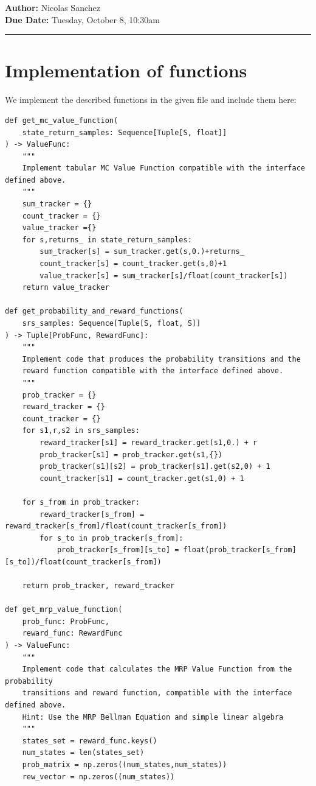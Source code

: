 \documentclass{article}[12pt]
\newcommand{\headings}[4]{\noindent {\bf Assignment 15 CME241} \hfill {{\bf Author:} Nicolas Sanchez} \\
{} \hfill {{\bf Due Date:} #2} \\

\rule[0.1in]{\textwidth}{0.025in}
}
\begin{document}
\headings{\#1}{Tuesday, October 8, 10:30am}\section{} 



\section{Implementation of functions}
We implement the described functions in the given file and include them here:
\begin{lstlisting}
def get_mc_value_function(
    state_return_samples: Sequence[Tuple[S, float]]
) -> ValueFunc:
    """
    Implement tabular MC Value Function compatible with the interface defined above.
    """
    sum_tracker = {}
    count_tracker = {}
    value_tracker ={}
    for s,returns_ in state_return_samples:
        sum_tracker[s] = sum_tracker.get(s,0.)+returns_
        count_tracker[s] = count_tracker.get(s,0)+1
        value_tracker[s] = sum_tracker[s]/float(count_tracker[s])
    return value_tracker
  
def get_probability_and_reward_functions(
    srs_samples: Sequence[Tuple[S, float, S]]
) -> Tuple[ProbFunc, RewardFunc]:
    """
    Implement code that produces the probability transitions and the
    reward function compatible with the interface defined above.
    """
    prob_tracker = {}
    reward_tracker = {}
    count_tracker = {}
    for s1,r,s2 in srs_samples:
        reward_tracker[s1] = reward_tracker.get(s1,0.) + r
        prob_tracker[s1] = prob_tracker.get(s1,{})
        prob_tracker[s1][s2] = prob_tracker[s1].get(s2,0) + 1
        count_tracker[s1] = count_tracker.get(s1,0) + 1

    for s_from in prob_tracker:
        reward_tracker[s_from] = reward_tracker[s_from]/float(count_tracker[s_from])
        for s_to in prob_tracker[s_from]:
            prob_tracker[s_from][s_to] = float(prob_tracker[s_from][s_to])/float(count_tracker[s_from])

    return prob_tracker, reward_tracker

def get_mrp_value_function(
    prob_func: ProbFunc,
    reward_func: RewardFunc
) -> ValueFunc:
    """
    Implement code that calculates the MRP Value Function from the probability
    transitions and reward function, compatible with the interface defined above.
    Hint: Use the MRP Bellman Equation and simple linear algebra
    """
    states_set = reward_func.keys()
    num_states = len(states_set)
    prob_matrix = np.zeros((num_states,num_states))
    rew_vector = np.zeros((num_states))
    

\end{lstlisting}
\end{document}
